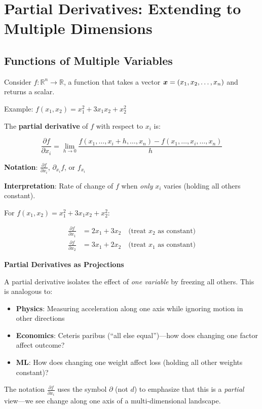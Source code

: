 \section{Partial Derivatives: Extending to Multiple Dimensions}

\subsection{Functions of Multiple Variables}

Consider $f: \mathbb{R}^n \to \mathbb{R}$, a function that takes a vector $\bm{x} = (x_1, x_2, \ldots, x_n)$ and returns a scalar.

Example: $f(x_1, x_2) = x_1^2 + 3x_1 x_2 + x_2^2$

\begin{definition}
The \textbf{partial derivative} of $f$ with respect to $x_i$ is:

\begin{equation}
    \frac{\partial f}{\partial x_i} = \lim_{h \to 0} \frac{f(x_1, \ldots, x_i + h, \ldots, x_n) - f(x_1, \ldots, x_i, \ldots, x_n)}{h}
\end{equation}

\textbf{Notation}: $\frac{\partial f}{\partial x_i}$, $\partial_{x_i} f$, or $f_{x_i}$

\textbf{Interpretation}: Rate of change of $f$ when \textit{only} $x_i$ varies (holding all others constant).
\end{definition}

\begin{example}
For $f(x_1, x_2) = x_1^2 + 3x_1 x_2 + x_2^2$:

\begin{align}
    \frac{\partial f}{\partial x_1} &= 2x_1 + 3x_2 \quad \text{(treat $x_2$ as constant)} \\
    \frac{\partial f}{\partial x_2} &= 3x_1 + 2x_2 \quad \text{(treat $x_1$ as constant)}
\end{align}
\end{example}

\begin{philobox}
\textbf{Partial Derivatives as Projections}

A partial derivative isolates the effect of \textit{one variable} by freezing all others. This is analogous to:

\begin{itemize}
    \item \textbf{Physics}: Measuring acceleration along one axis while ignoring motion in other directions
    \item \textbf{Economics}: Ceteris paribus (``all else equal'')---how does changing one factor affect outcome?
    \item \textbf{ML}: How does changing one weight affect loss (holding all other weights constant)?
\end{itemize}

The notation $\frac{\partial f}{\partial x_i}$ uses the symbol $\partial$ (not $d$) to emphasize that this is a \textit{partial} view---we see change along one axis of a multi-dimensional landscape.
\end{philobox}

